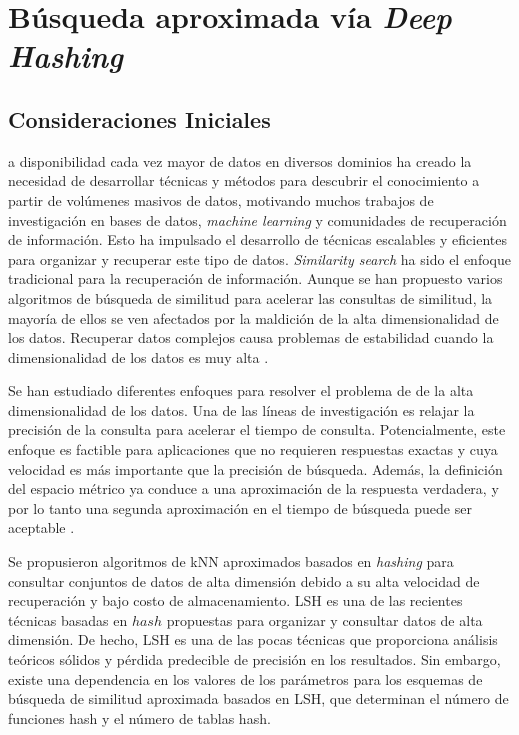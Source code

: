 
\chapter{Búsqueda aproximada vía \textit{Deep Hashing}}

\section{Consideraciones Iniciales}
 
a disponibilidad cada vez mayor de datos en diversos dominios ha creado la necesidad de desarrollar técnicas y métodos para descubrir el conocimiento a partir de volúmenes masivos de datos, motivando muchos trabajos de investigación en bases de datos, \textit{machine learning} y comunidades de recuperación de información. Esto ha impulsado el desarrollo de técnicas escalables y eficientes para organizar y recuperar este tipo de datos. \textit{Similarity search} ha sido el enfoque tradicional para la recuperación de información. Aunque se han propuesto varios algoritmos de búsqueda de similitud para acelerar las consultas de similitud, la mayoría de ellos se ven afectados por la maldición de la alta dimensionalidad de los datos. Recuperar datos complejos causa problemas de estabilidad cuando la dimensionalidad de los datos es muy alta \cite{aleman_high_dimensional}.


Se han estudiado diferentes enfoques para resolver el problema de de la alta dimensionalidad de los datos. Una de las líneas de investigación es relajar la precisión de la consulta para acelerar el tiempo de consulta. Potencialmente, este enfoque es factible para aplicaciones que no requieren respuestas exactas y cuya velocidad es más importante que la precisión de búsqueda. Además, la definición del espacio métrico ya conduce a una aproximación de la respuesta verdadera, y por lo tanto una segunda aproximación en el tiempo de búsqueda puede ser aceptable \cite{cit:avez99searching}.

Se propusieron algoritmos de kNN aproximados basados en \textit{hashing} para consultar conjuntos de datos de alta dimensión debido a su alta velocidad de recuperación y bajo costo de almacenamiento. \acf{LSH} \cite{lsh} es una de las recientes técnicas basadas en $hash$ propuestas para organizar y consultar datos de alta dimensión. De hecho, LSH es una de las pocas técnicas que proporciona análisis teóricos sólidos y pérdida predecible de precisión en los resultados. Sin embargo, existe una dependencia en los valores de los parámetros para los esquemas de búsqueda de similitud aproximada basados en LSH, que determinan el número de funciones hash y el número de tablas hash.

